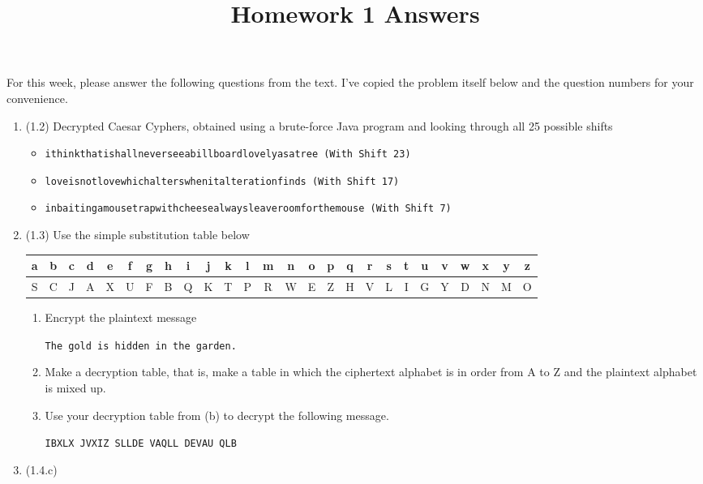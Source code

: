 \documentclass[12pt]{amsart}
\theoremstyle{definition}
\begin{document}
\title{Homework 1 Answers}

\maketitle

For this week, please answer the following questions from the text. 
I've copied the problem itself below and the question numbers for 
your convenience. 

\begin{enumerate}
	\item (1.2) Decrypted Caesar Cyphers, obtained using a brute-force Java program and looking through all 25 possible shifts
		\begin{itemize}
			\item \texttt{ithinkthatishallneverseeabillboardlovelyasatree (With Shift 23)}
			\item \texttt{loveisnotlovewhichalterswhenitalterationfinds (With Shift 17)}
			\item \texttt{inbaitingamousetrapwithcheesealwaysleaveroomforthemouse (With Shift 7)}
		\end{itemize}
	\item (1.3) Use the simple substitution table below
	\begin{center}
		\begin{tabular}{|c |c |c |c |c |c |c |c |c |c |c |c |c |c |c |c |c |c |c |c |c |c |c |c| c| c|}
			\hline
			a & b & c & d & e & f & g & h & i & j & k & l & m & n & o & 
			p & q & r & s & t & u & v & w & x & y & z \\
			\hline
			S & C & J & A & X & U & F & B & Q & K & T & P & R & W & E & 
			Z & H & V & L & I & G & Y & D & N & M & O \\
			\hline
		\end{tabular}
	\end{center}
	\begin{enumerate}
		\item Encrypt the plaintext message
		\begin{center}
			\texttt{The gold is hidden in the garden.}
		\end{center}
		\item Make a decryption table, that is, make a table in which the ciphertext 
			alphabet is in order from A to Z and the plaintext alphabet is mixed up.
		\item Use your decryption table from (b) to decrypt the following message.
		\begin{center}
			\texttt{IBXLX JVXIZ SLLDE VAQLL DEVAU QLB}
		\end{center}
	\end{enumerate}
\item (1.4.c) 


\end{enumerate}
\end{document}
